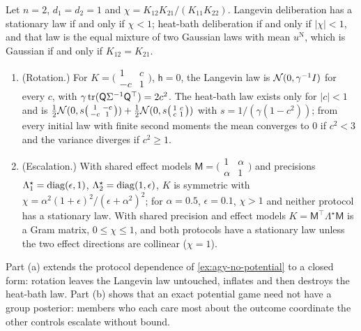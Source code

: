 \begin{proposition}\label{prop:obj-protocol}
Let $n=2$, $d_1=d_2=1$ and $\chi=K_{12}K_{21}/(K_{11}K_{22})$. Langevin deliberation has a stationary law if and only if $\chi<1$; heat-bath deliberation if and only if $\lvert\chi\rvert<1$, and that law is the equal mixture of two Gaussian laws with mean $u^{\mathrm N}$, which is Gaussian if and only if $K_{12}=K_{21}$.
\begin{enumerate}
\item[(a)] (Rotation.) For $K=\bigl(\begin{smallmatrix}1&c\\-c&1\end{smallmatrix}\bigr)$, $\mathsf h=0$, the Langevin law is $\mathcal{N}(0,\gamma^{-1}I)$ for every $c$, with $\gamma\operatorname{tr}(\mathsf Q\Sigma^{-1}\mathsf Q^\top)=2c^2$. The heat-bath law exists only for $\lvert c\rvert<1$ and is $\tfrac12\mathcal{N}(0,s\bigl(\begin{smallmatrix}1&-c\\-c&1\end{smallmatrix}\bigr))+\tfrac12\mathcal{N}(0,s\bigl(\begin{smallmatrix}1&c\\c&1\end{smallmatrix}\bigr))$ with $s=1/(\gamma(1-c^2))$; from every initial law with finite second moments the mean converges to $0$ if $c^2<3$ and the variance diverges if $c^2\ge1$.
\item[(b)] (Escalation.) With shared effect models $\mathsf M=\bigl(\begin{smallmatrix}1&\alpha\\\alpha&1\end{smallmatrix}\bigr)$ and precisions $\Lambda^\star_1=\operatorname{diag}(\epsilon,1)$, $\Lambda^\star_2=\operatorname{diag}(1,\epsilon)$, $K$ is symmetric with $\chi=\alpha^2(1+\epsilon)^2/(\epsilon+\alpha^2)^2$; for $\alpha=0.5$, $\epsilon=0.1$, $\chi>1$ and neither protocol has a stationary law. With shared precision and effect models $K=\mathsf M^\top\Lambda^\star\mathsf M$ is a Gram matrix, $0\le\chi\le1$, and both protocols have a stationary law unless the two effect directions are collinear ($\chi=1$).
\end{enumerate}
\end{proposition}

Part (a) extends the protocol dependence of \cref{ex:agy-no-potential} to a closed form: rotation leaves the Langevin law untouched, inflates and then destroys the heat-bath law. Part (b) shows that an exact potential game need not have a group posterior: members who each care most about the outcome coordinate the other controls escalate without bound.

